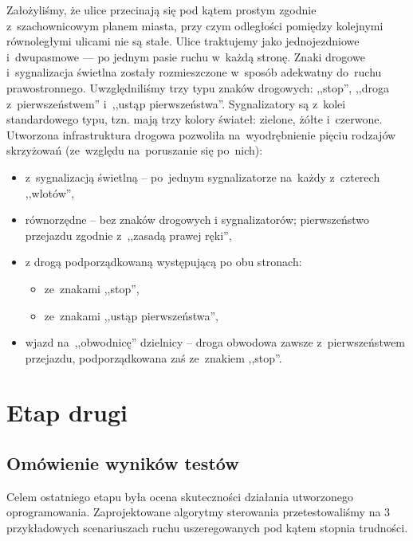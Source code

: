 \documentclass[11pt, a4paper, twoside]{report}
\begin{document}
Założyliśmy, że ulice przecinają się pod kątem prostym zgodnie z~szachownicowym planem miasta, przy czym odległości pomiędzy kolejnymi równoległymi ulicami nie są stałe. Ulice traktujemy jako jednojezdniowe i~dwupasmowe --- po jednym pasie ruchu w~każdą stronę. Znaki drogowe i~sygnalizacja świetlna zostały rozmieszczone w~sposób adekwatny do~ruchu prawostronnego. Uwzględniliśmy trzy typu znaków drogowych: ,,stop'', ,,droga z~pierwszeństwem'' i~,,ustąp pierwszeństwa''. Sygnalizatory są z~kolei standardowego typu, tzn. mają trzy kolory świateł: zielone, żółte i~czerwone. Utworzona infrastruktura drogowa pozwoliła na~wyodrębnienie pięciu rodzajów skrzyżowań (ze~względu na~poruszanie się po~nich):
\begin{itemize}
	\item z~sygnalizacją świetlną -- po~jednym sygnalizatorze na~każdy z~czterech ,,wlotów'',
	\item równorzędne -- bez znaków drogowych i sygnalizatorów; pierwszeństwo przejazdu zgodnie z~,,zasadą prawej ręki'',
	\item z drogą podporządkowaną występującą po obu stronach:
	\begin{itemize}
		\item ze~znakami ,,stop'',
		\item ze~znakami ,,ustąp pierwszeństwa'',
	\end{itemize}
	\item wjazd na~,,obwodnicę'' dzielnicy -- droga obwodowa zawsze z~pierwszeństwem przejazdu, podporządkowana zaś ze~znakiem ,,stop''.
\end{itemize}






\chapter{Etap drugi} 
\section{Omówienie wyników testów} \vspace{-0.2cm}
Celem ostatniego etapu była ocena skuteczności działania utworzonego oprogramowania. Zaprojektowane algorytmy sterowania przetestowaliśmy na 3 przykładowych scenariuszach ruchu uszeregowanych pod kątem stopnia trudności. \vspace{-0.2cm}


\end{document}
